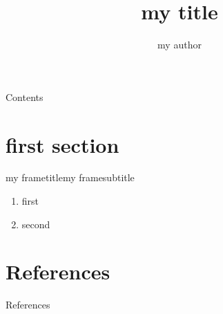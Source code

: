 
\usepackage[style=numeric,sorting=none,backend=biber]{biblatex}

\renewcommand*{\bibfont}{\scriptsize}

\title{\textbf{my title}}
\author{my author}



\begin{frame}
  \titlepage
\end{frame}

\begin{frame}{Contents}
  \tableofcontents
\end{frame}

\section{first section}
\begin{frame}{my frametitle}{my framesubtitle}
  \begin{enumerate}
    \item first \cite{one}
    \item second
  \end{enumerate}
\end{frame}

\section{References}
\begin{frame}[t,allowframebreaks]{References}
  \printbibliography
\end{frame}


